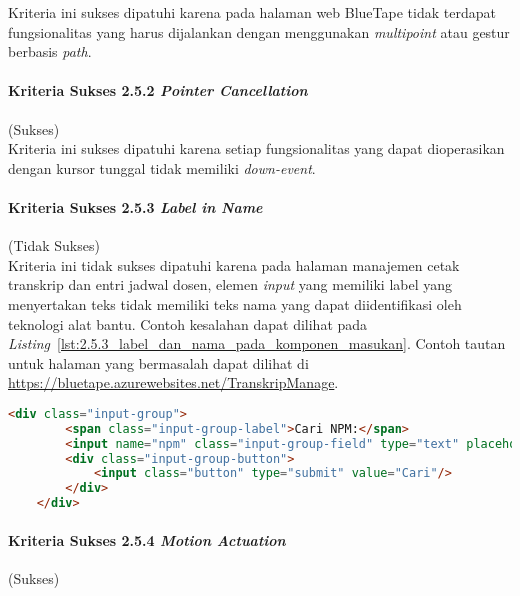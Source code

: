 Kriteria ini sukses dipatuhi karena pada halaman web BlueTape tidak terdapat fungsionalitas yang harus dijalankan dengan menggunakan \textit{multipoint} atau gestur berbasis \textit{path}.

\paragraph{Kriteria Sukses 2.5.2 \textit{Pointer Cancellation}}
\label{par:kepatuhan_bluetape_kriteria_sukses_2.5.2}
(Sukses)\\

Kriteria ini sukses dipatuhi karena setiap fungsionalitas yang dapat dioperasikan dengan kursor tunggal tidak memiliki \textit{down-event}.

\paragraph{Kriteria Sukses 2.5.3 \textit{Label in Name}}
\label{par:kepatuhan_bluetape_kriteria_sukses_2.5.3}
(Tidak Sukses)\\

Kriteria ini tidak sukses dipatuhi karena pada halaman manajemen cetak transkrip dan entri jadwal dosen, elemen \textit{input} yang memiliki label yang menyertakan teks tidak memiliki teks nama yang dapat diidentifikasi oleh teknologi alat bantu. Contoh kesalahan dapat dilihat pada \mbox{\textit{Listing} \ref{lst:2.5.3_label_dan_nama_pada_komponen_masukan}}. Contoh tautan untuk halaman yang bermasalah dapat dilihat di \url{https://bluetape.azurewebsites.net/TranskripManage}.

\begin{lstlisting}[frame=single, label={lst:2.5.3_label_dan_nama_pada_komponen_masukan}, language=HTML, caption=Pelanggaran Kriteria Sukses 2.5.3 pada Halaman Manajemen Cetak Transkrip]
    <div class="input-group">
        <span class="input-group-label">Cari NPM:</span>
        <input name="npm" class="input-group-field" type="text" placeholder="2013730013" maxlength="10" minlength="10"<?= $npmQuery === NULL ? '' : " value='$npmQuery'" ?>/>
        <div class="input-group-button">
            <input class="button" type="submit" value="Cari"/>
        </div>
    </div>
\end{lstlisting}

\paragraph{Kriteria Sukses 2.5.4 \textit{Motion Actuation}}
\label{par:kepatuhan_bluetape_kriteria_sukses_2.5.4}
(Sukses)\\


